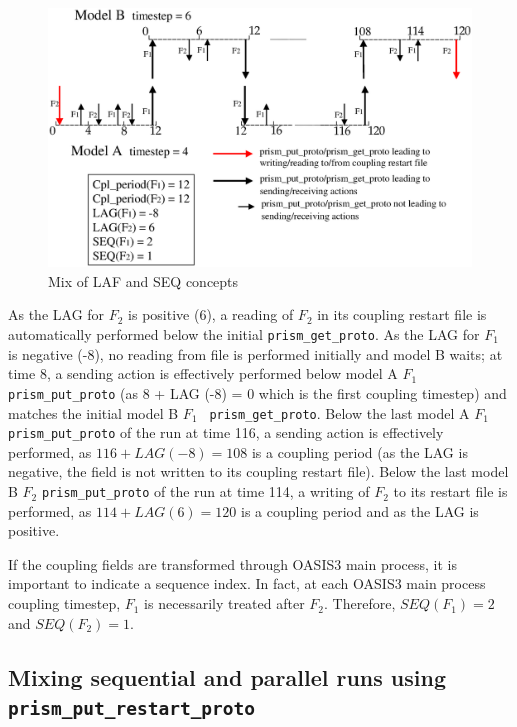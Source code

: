 \begin{figure}
\includegraphics[scale=.6]{fig_mix_seqlag.eps}
\caption{Mix of LAF and SEQ concepts}
\label{fig:mix_seqlag}
\end{figure}

As the LAG for $F_2$ is positive (6), a reading of $F_2$ in its
coupling restart file is automatically performed below the initial
{\tt prism\_get\_proto}. As the LAG for $F_1$ is negative (-8), no
reading from file is performed initially and model B waits; at time 8,
a sending action is effectively performed below model A $F_1$ {\tt
prism\_put\_proto} (as 8 + LAG (-8) = 0 which is the first coupling
timestep) and matches the initial model B $F_1$ {\tt
prism\_get\_proto}. Below the last model A $F_1$ {\tt
prism\_put\_proto} of the run at time 116, a sending action is
effectively performed, as $116 + LAG(-8) = 108$ is a coupling period
(as the LAG is negative, the field is not written to its coupling
restart file). Below the last model B $F_2$ {\tt prism\_put\_proto} of
the run at time 114, a writing of $F_2$ to its restart file is
performed, as $114 + LAG(6) = 120$ is a coupling period and as the LAG
is positive.

If the coupling fields are transformed through OASIS3 main process, it
is important to indicate a sequence index. In fact, at each OASIS3
main process coupling timestep, $F_1$ is necessarily treated after
$F_2$. Therefore, $SEQ(F_1) = 2$ and $SEQ(F_2) = 1$.

\subsection{Mixing sequential and parallel
    runs using {\tt prism\_put\_restart\_proto}}

